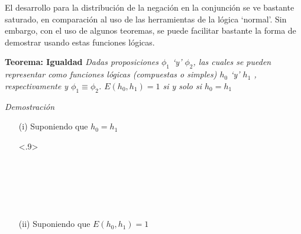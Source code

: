 
El desarrollo para la distribución de la negación en la conjunción se ve bastante saturado, en comparación al uso de las herramientas de la lógica `normal'. Sin embargo, con el uso de algunos teoremas, se puede facilitar bastante la forma de demostrar usando estas funciones lógicas.

\begin{proofbox}[10]{\textbf{Teorema: Igualdad}}\label{Teo_igualdad}
    \emph{
        Dadas proposiciones $\phi_1$ `y' $\phi_2$, las cuales se pueden representar como funciones lógicas (compuestas o simples) $h_0$ `y' $h_1$ , respectivamente y $\phi_1 \equiv \phi_2$. $E(h_0, h_1) = 1$ si y solo si $h_0 = h_1$ 
    }    
\end{proofbox}

\begin{subproofbox}[10]{\emph{Demostración}}
    \begin{itemize}
        \item[(i)] Suponiendo que $h_0 = h_1$
        
        \begin{center}
            \begin{derivation}<.9>
                    \\
                \why*[=]{}\\
                    \\
                \\
                    \\
                \why*[=]{}\\
            \end{derivation}
        \end{center}

        \item[(ii)] Suponiendo que $E(h_0, h_1) = 1$
        

\end{itemize}
\end{subproofbox}
